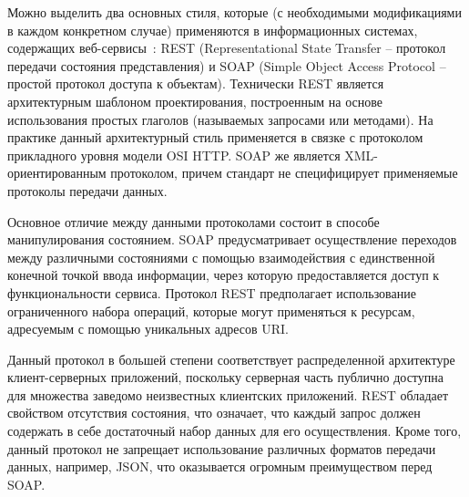Можно выделить два основных стиля, которые (с необходимыми модификациями в каждом конкретном случае) применяются в информационных системах, содержащих веб-сервисы~\cite{application_architecture_guide}: REST (Representational State Transfer -- протокол передачи состояния представления) и SOAP (Simple Object Access Protocol -- простой протокол доступа к объектам). Технически REST является архитектурным шаблоном проектирования, построенным на основе использования простых глаголов (называемых запросами или методами). На практике данный архитектурный стиль применяется в связке с протоколом прикладного уровня модели OSI HTTP. SOAP же является XML-ориентированным протоколом, причем стандарт не специфицирует применяемые протоколы передачи данных.

Основное отличие между данными протоколами состоит в способе манипулирования состоянием. SOAP предусматривает осуществление переходов между различными состояниями с помощью взаимодействия с единственной конечной точкой ввода информации, через которую предоставляется доступ к функциональности сервиса. Протокол REST предполагает использование ограниченного набора операций, которые могут применяться к ресурсам, адресуемым с помощью уникальных адресов URI. 

Данный протокол в большей степени соответствует распределенной архитектуре клиент-серверных приложений, поскольку серверная часть публично доступна для множества заведомо неизвестных клиентских приложений. REST обладает свойством отсутствия состояния, что означает, что каждый запрос должен содержать в себе достаточный набор данных для его осуществления. Кроме того, данный протокол не запрещает использование различных форматов передачи данных, например, JSON, что оказывается огромным преимуществом перед SOAP.
